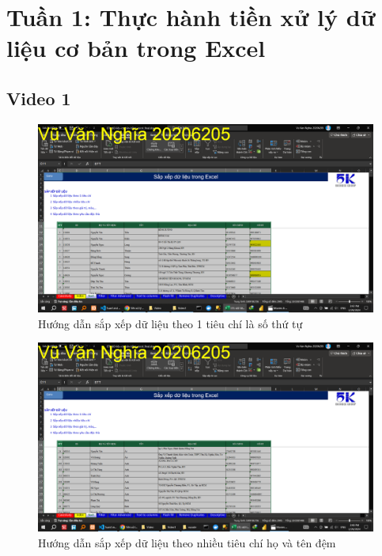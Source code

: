 \documentclass{article}
\begin{document}
\tableofcontents
\newpage
\listoffigures
\newpage
\section{Tuần 1: Thực hành tiền xử lý dữ liệu  cơ bản trong Excel}
\subsection{Video 1}
\begin{figure}[H]
\centering
\includegraphics[scale = 0.15]{Video1/HuongDan/1.png}
\caption{Hướng dẫn sắp xếp dữ liệu theo 1 tiêu chí là số thứ tự}
\end{figure}

\begin{figure}[H]
\centering
\includegraphics[scale = 0.15]{Video1/HuongDan/2.png}
\caption{Hướng dẫn sắp xếp dữ liệu theo nhiều tiêu chí họ và tên đệm}
\end{figure}
\end{document}
